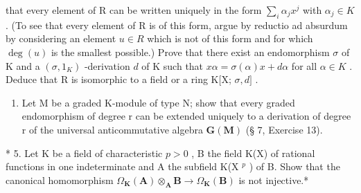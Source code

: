 that every element of R can be written uniquely in the form \(\sum_{i} \alpha_j x^j\) with \(\alpha_j \in K\) . (To see that every element of R is of this form, argue by reductio ad absurdum by considering an element \(u \in R\) which is not of this form and for which \(\deg(u)\) is the smallest possible.) Prove that there exist an endomorphism \(\sigma\) of K and a \((\sigma, 1_K)\) -derivation \(d\) of K such that \(x\alpha = \sigma(\alpha)x + d\alpha\) for all \(\alpha \in K\) . Deduce that R is isomorphic to a field or a ring K{[}X; \(\sigma, d]\) .

\begin{enumerate}
\def\labelenumi{\arabic{enumi}.}
\setcounter{enumi}{3}
\tightlist
\item
  Let M be a graded K-module of type N; show that every graded endomorphism of degree r can be extended uniquely to a derivation of degree r of the universal anticommutative algebra \(\mathbf{G}(\mathbf{M})\) (§ 7, Exercise 13).
\end{enumerate}

* 5. Let K be a field of characteristic \(p > 0\) , B the field K(X) of rational functions in one indeterminate and A the subfield K(X \(^{p}\) ) of B. Show that the canonical homomorphism \(\Omega_{\mathbf{K}}(\mathbf{A}) \otimes_{\mathbf{A}} \mathbf{B} \to \Omega_{\mathbf{K}}(\mathbf{B})\) is not injective.*

\BourbakiExercisesSection

